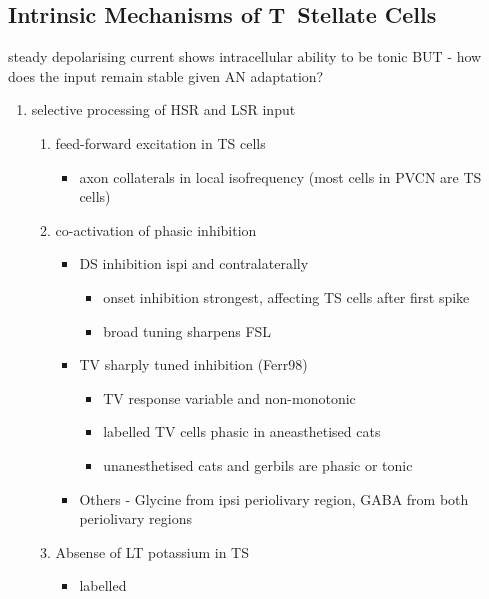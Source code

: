 \subsection{Intrinsic Mechanisms of T~Stellate Cells}\label{sec:intr-mech-tstellate} %



steady depolarising current shows intracellular ability to be tonic \cite{Oertel:1983,OertelWuEtAl:1988} BUT - how does the input remain stable given AN adaptation?


\begin{enumerate}
\item selective processing of HSR and LSR input
\begin{enumerate}
\item feed-forward excitation in TS cells
\begin{itemize}
\item axon collaterals in local isofrequency (most cells in PVCN are TS cells)
\end{itemize}
\item co-activation of phasic inhibition
\begin{itemize}
\item DS inhibition ispi and contralaterally
\begin{itemize}
\item onset inhibition strongest, affecting TS cells after first spike
\item broad tuning sharpens FSL
\end{itemize}
\item TV sharply tuned inhibition (Ferr98)
\begin{itemize}
\item TV response variable and non-monotonic
\item \citep{Rhode:1999}  labelled TV cells phasic in aneasthetised cats
\item unanesthetised cats and gerbils are phasic or tonic  \citep{DingVoigt:1997,ShofnerYoung:1985}
\end{itemize}
\item Others - Glycine from ipsi periolivary region, GABA from both
          periolivary regions \citep{AdamsWarr:1976,ShoreHelfertEtAl:1991,OstapoffBensonEtAl:1997}
\end{itemize}
\item Absense of LT potassium in TS
\begin{itemize}
\item labelled \citep{ManisMarx:1991,BalOertel:2001,FerragamoOertel:2002,CaoShatadalEtAl:2007}

\end{itemize}
\end{enumerate}
\end{enumerate}
